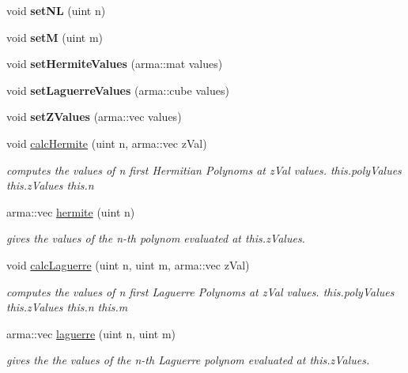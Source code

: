 \begin{DoxyCompactItemize}
\item 
void {\bfseries set\+NL} (uint n)\hypertarget{classPoly_a0013f1e90ed7c1224d24a21c4c839c66}{}\label{classPoly_a0013f1e90ed7c1224d24a21c4c839c66}

\item 
void {\bfseries setM} (uint m)\hypertarget{classPoly_a5d64653139b15bf146c9da1f9a7febe8}{}\label{classPoly_a5d64653139b15bf146c9da1f9a7febe8}

\item 
void {\bfseries set\+Hermite\+Values} (arma\+::mat values)\hypertarget{classPoly_a5192fa805f31eefd0fa282f4edc14f9b}{}\label{classPoly_a5192fa805f31eefd0fa282f4edc14f9b}

\item 
void {\bfseries set\+Laguerre\+Values} (arma\+::cube values)\hypertarget{classPoly_acc6959f3faf247d11e56c98db58e9eb4}{}\label{classPoly_acc6959f3faf247d11e56c98db58e9eb4}

\item 
void {\bfseries set\+Z\+Values} (arma\+::vec values)\hypertarget{classPoly_acd863970a6d5231f9e3e4731d9194daf}{}\label{classPoly_acd863970a6d5231f9e3e4731d9194daf}

\item 
void \hyperlink{classPoly_ae33b266f64312a8a5c0ef3d09be7c62a}{calc\+Hermite} (uint n, arma\+::vec z\+Val)
\begin{DoxyCompactList}\small\item\em computes the values of n first Hermitian Polynoms at z\+Val values.  this.\+poly\+Values  this.\+z\+Values  this.\+n \end{DoxyCompactList}\item 
arma\+::vec \hyperlink{classPoly_a2d928621a2d9b14f2895e261dc72c9df}{hermite} (uint n)
\begin{DoxyCompactList}\small\item\em gives the values of the n-\/th polynom evaluated at this.\+z\+Values. \end{DoxyCompactList}\item 
void \hyperlink{classPoly_acb8409eaa3ba9a481249d63f5e605c73}{calc\+Laguerre} (uint n, uint m, arma\+::vec z\+Val)
\begin{DoxyCompactList}\small\item\em computes the values of n first Laguerre Polynoms at z\+Val values.  this.\+poly\+Values  this.\+z\+Values  this.\+n  this.\+m \end{DoxyCompactList}\item 
arma\+::vec \hyperlink{classPoly_a786d2f2876add55bc3222387a66354ee}{laguerre} (uint n, uint m)
\begin{DoxyCompactList}\small\item\em gives the the values of the n-\/th Laguerre polynom evaluated at this.\+z\+Values. \end{DoxyCompactList}\end{DoxyCompactItemize}
